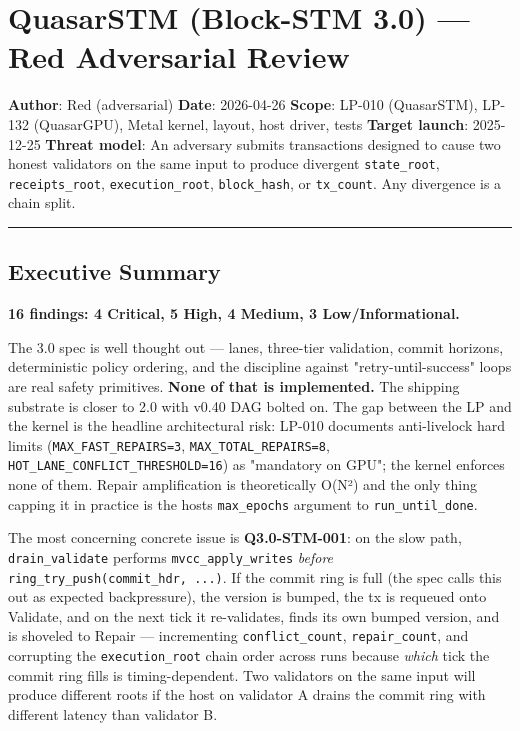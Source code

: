 \documentclass[
]{article}
\author{}
\date{}
\begin{document}
\section{QuasarSTM (Block-STM 3.0) --- Red Adversarial
Review}\label{quasarstm-block-stm-30--red-adversarial-review}

\textbf{Author}: Red (adversarial) \textbf{Date}: 2026-04-26
\textbf{Scope}: LP-010 (QuasarSTM), LP-132 (QuasarGPU), Metal kernel,
layout, host driver, tests \textbf{Target launch}: 2025-12-25
\textbf{Threat model}: An adversary submits transactions designed to
cause two honest validators on the same input to produce divergent
\texttt{state\_root}, \texttt{receipts\_root}, \texttt{execution\_root},
\texttt{block\_hash}, or \texttt{tx\_count}. Any divergence is a chain
split.

\begin{center}\rule{0.5\linewidth}{0.5pt}\end{center}

\subsection{Executive Summary}\label{executive-summary}

\textbf{16 findings: 4 Critical, 5 High, 4 Medium, 3 Low/Informational.}

The 3.0 spec is well thought out --- lanes, three-tier validation,
commit horizons, deterministic policy ordering, and the discipline
against "retry-until-success" loops are real safety primitives.
\textbf{None of that is implemented.} The shipping substrate is closer
to 2.0 with v0.40 DAG bolted on. The gap between the LP and the kernel
is the headline architectural risk: LP-010 documents anti-livelock hard
limits (\texttt{MAX\_FAST\_REPAIRS=3}, \texttt{MAX\_TOTAL\_REPAIRS=8},
\texttt{HOT\_LANE\_CONFLICT\_THRESHOLD=16}) as "mandatory on GPU"; the
kernel enforces none of them. Repair amplification is theoretically
O(N²) and the only thing capping it in practice is the
host\textquotesingle s \texttt{max\_epochs} argument to
\texttt{run\_until\_done}.

The most concerning concrete issue is \textbf{Q3.0-STM-001}: on the slow
path, \texttt{drain\_validate} performs \texttt{mvcc\_apply\_writes}
\emph{before} \texttt{ring\_try\_push(commit\_hdr,\ ...)}. If the commit
ring is full (the spec calls this out as expected backpressure), the
version is bumped, the tx is requeued onto Validate, and on the next
tick it re-validates, finds its own bumped version, and is shoveled to
Repair --- incrementing \texttt{conflict\_count},
\texttt{repair\_count}, and corrupting the \texttt{execution\_root}
chain order across runs because \emph{which} tick the commit ring fills
is timing-dependent. Two validators on the same input will produce
different roots if the host on validator A drains the commit ring with
different latency than validator B.
\end{document}
